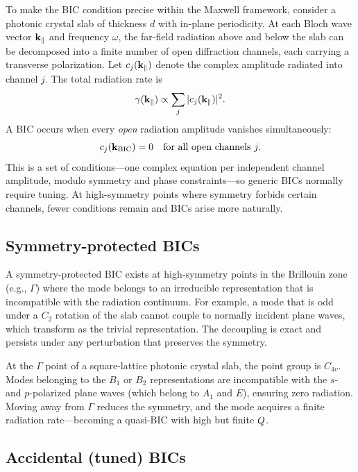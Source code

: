 To make the BIC condition precise within the Maxwell framework, consider
a photonic crystal slab of thickness $d$ with in-plane periodicity. At
each Bloch wave vector $\mathbf{k}_\parallel$ and frequency $\omega$, the
far-field radiation above and below the slab can be decomposed into a
finite number of open diffraction channels, each carrying a transverse
polarization. Let $c_j(\mathbf{k}_\parallel)$ denote the complex amplitude
radiated into channel $j$. The total radiation rate is
\begin{equation}
 \gamma(\mathbf{k}_\parallel) \propto \sum_j |c_j(\mathbf{k}_\parallel)|^2.
 \label{eq:radiation-rate}
\end{equation}
A BIC occurs when every \emph{open} radiation amplitude vanishes
simultaneously:
\begin{equation}
 c_j(\mathbf{k}_{\mathrm{BIC}}) = 0 \quad \text{for all open channels } j.
 \label{eq:bic-all-zero}
\end{equation}
This is a set of conditions---one complex equation per independent
channel amplitude, modulo symmetry and phase constraints---so generic
BICs normally require tuning. At high-symmetry points where symmetry
forbids certain channels, fewer conditions remain and BICs arise more
naturally.

\subsection{Symmetry-protected BICs}
\label{ssec:symmetry-bic}

A symmetry-protected BIC exists at high-symmetry points in the Brillouin
zone (e.g., $\Gamma$) where the mode belongs to an irreducible
representation that is incompatible with the radiation continuum. For
example, a mode that is odd under a $C_2$ rotation of the slab cannot
couple to normally incident plane waves, which transform as the trivial
representation. The decoupling is exact and persists under any
perturbation that preserves the symmetry.

At the $\Gamma$ point of a square-lattice photonic crystal slab, the
point group is $C_{4v}$. Modes belonging to the $B_1$ or $B_2$
representations are incompatible with the $s$- and $p$-polarized plane
waves (which belong to $A_1$ and $E$), ensuring zero radiation. Moving
away from $\Gamma$ reduces the symmetry, and the mode acquires a finite
radiation rate---becoming a quasi-BIC with high but finite $Q$.

\subsection{Accidental (tuned) BICs}
\label{ssec:accidental-bic}

